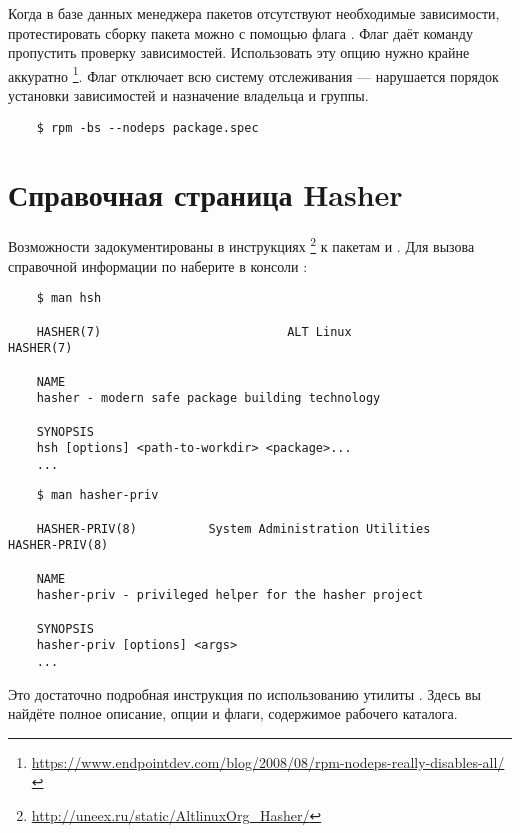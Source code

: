 Когда в базе данных менеджера пакетов отсутствуют необходимые зависимости, протестировать сборку пакета 
можно с помощью флага . Флаг  даёт команду пропустить проверку зависимостей. 
Использовать эту опцию нужно крайне аккуратно%
\footnote{\href{https://www.endpointdev.com/blog/2008/08/rpm-nodeps-really-disables-all/}{https://www.endpointdev.com/blog/2008/08/rpm-nodeps-really-disables-all/}}. 
Флаг  отключает всю систему отслеживания  --- нарушается порядок установки зависимостей 
и назначение владельца и группы.

\begin{verbatim}
	$ rpm -bs --nodeps package.spec
\end{verbatim} 

\section{Справочная страница Hasher}
Возможности  задокументированы в инструкциях%
\footnote{\href{http://uneex.ru/static/AltlinuxOrg_Hasher/}{http://uneex.ru/static/AltlinuxOrg\_Hasher/}} 
к пакетам  и . Для вызова справочной информации по  наберите 
в консоли :
\begin{verbatim}
	$ man hsh
	
	HASHER(7)                          ALT Linux                         HASHER(7)
	
	NAME
	hasher - modern safe package building technology
	
	SYNOPSIS
	hsh [options] <path-to-workdir> <package>...
	...
\end{verbatim} 

\begin{verbatim}
	$ man hasher-priv
	
	HASHER-PRIV(8)          System Administration Utilities         HASHER-PRIV(8)
	
	NAME
	hasher-priv - privileged helper for the hasher project
	
	SYNOPSIS
	hasher-priv [options] <args>
	...
\end{verbatim}

Это достаточно подробная инструкция по использованию утилиты . Здесь вы найдёте 
полное описание, опции и флаги, содержимое рабочего каталога. 


